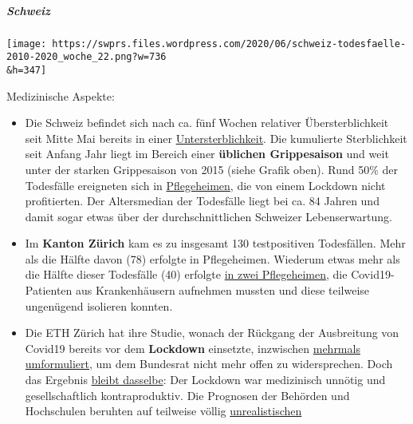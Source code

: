\hypertarget{schweiz-1}{%
\subparagraph{\texorpdfstring{\textbf{Schweiz}}{Schweiz}}\label{schweiz-1}}

\texttt{[image: https://swprs.files.wordpress.com/2020/06/schweiz-todesfaelle-2010-2020\_woche\_22.png?w=736\\\&h=347]}

Medizinische Aspekte:

\begin{itemize}
\tightlist
\item
  Die Schweiz befindet sich nach ca. fünf Wochen relativer
  Übersterblichkeit seit Mitte Mai bereits in einer
  \href{https://swprs.files.wordpress.com/2020/06/schweiz-todesfaelle-2010-2020_woche_22.pdf}{Untersterblichkeit}.
  Die kumulierte Sterblichkeit seit Anfang Jahr liegt im Bereich einer
  \textbf{üblichen Grippesaison} und weit unter der starken Grippesaison
  von 2015 (siehe Grafik oben). Rund 50\% der Todesfälle ereigneten sich
  in
  \href{https://www.nzz.ch/zuerich/coronavirus-zuerich-aendert-nun-das-testregime-in-heimenauch-viele-aeltere-covid-19-infizierte-entwickeln-keine-symptome-zuerich-aendert-nun-das-testregime-in-heimen-ld.1552089}{Pflegeheimen},
  die von einem Lockdown nicht profitierten. Der Altersmedian der
  Todesfälle liegt bei ca. 84 Jahren und damit sogar etwas über der
  durchschnittlichen Schweizer Lebenserwartung.
\item
  Im \textbf{Kanton Zürich} kam es zu insgesamt 130 testpositiven
  Todesfällen. Mehr als die Hälfte davon (78) erfolgte in Pflegeheimen.
  Wiederum etwas mehr als die Hälfte dieser Todesfälle (40) erfolgte
  \href{https://www.republik.ch/2020/05/28/toedlicher-zufall}{in zwei
  Pflegeheimen}, die Covid19-Patienten aus Krankenhäusern aufnehmen
  mussten und diese teilweise ungenügend isolieren konnten.
\item
  Die ETH Zürich hat ihre Studie, wonach der Rückgang der Ausbreitung
  von Covid19 bereits vor dem \textbf{Lockdown} einsetzte, inzwischen
  \href{https://www.luzernerzeitung.ch/schweiz/die-schweiz-haette-die-kurve-auch-mit-weniger-einschraenkungen-gekriegt-war-der-lockdown-uebertrieben-ld.1221111}{mehrmals
  umformuliert}, um dem Bundesrat nicht mehr offen zu widersprechen.
  Doch das Ergebnis
  \href{https://infekt.ch/2020/04/sind-wir-tatsaechlich-im-blindflug/}{bleibt
  dasselbe}: Der Lockdown war medizinisch unnötig und gesellschaftlich
  kontraproduktiv. Die Prognosen der Behörden und Hochschulen beruhten
  auf teilweise völlig
  \href{https://www.cash.ch/news/politik/coronavirus-schweizer-wissenschaftler-warnen-vor-knappheit-bei-spitalbetten-1511778}{unrealistischen
}
\end{itemize}
